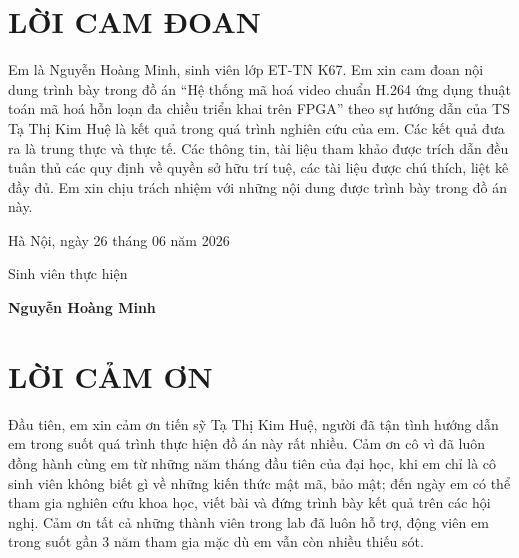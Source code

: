 \documentclass{thesis}
\begin{document}
\thispagestyle{empty}
    \newpage
        \clearpage
            \thispagestyle{empty}
                \cleardoublepage

\section*{LỜI CAM ĐOAN}
    \thispagestyle{empty}
Em là Nguyễn Hoàng Minh, sinh viên lớp ET-TN K67. Em xin cam đoan nội dung trình bày trong đồ án ``Hệ thống mã hoá video chuẩn H.264 ứng dụng thuật toán mã hoá hỗn loạn đa chiều triển khai trên FPGA'' theo sự hướng dẫn của TS Tạ Thị Kim Huệ là kết quả trong quá trình nghiên cứu của em. Các kết quả đưa ra là trung thực và thực tế. Các thông tin, tài liệu tham khảo được trích dẫn đều tuân thủ các quy định về quyền sở hữu trí tuệ, các tài liệu được chú thích, liệt kê đầy đủ. Em xin chịu trách nhiệm với những nội dung được trình bày trong đồ án này.

\vspace{6pt}
    \hspace{7cm}Hà Nội, ngày 26 tháng 06 năm 2026

        \hspace{8.6cm} Sinh viên thực hiện

\vspace{2cm}
    \hspace{8.6cm}\textbf{Nguyễn Hoàng Minh}

\thispagestyle{empty}
    \newpage
        \clearpage
            \thispagestyle{empty}
                \cleardoublepage

\newpage
\section*{LỜI CẢM ƠN}
    \thispagestyle{empty}
Đầu tiên, em xin cảm ơn tiến sỹ Tạ Thị Kim Huệ, người đã tận tình hướng dẫn em trong suốt quá trình thực hiện đồ án này rất nhiều. Cảm ơn cô vì đã luôn đồng hành cùng em từ những năm tháng đầu tiên của đại học, khi em chỉ là cô sinh viên không biết gì về những kiến thức mật mã, bảo mật; đến ngày em có thể tham gia nghiên cứu khoa học, viết bài và đứng trình bày kết quả trên các hội nghị. Cảm ơn tất cả những thành viên trong lab đã luôn hỗ trợ, động viên em trong suốt gần 3 năm tham gia mặc dù em vẫn còn nhiều thiếu sót.
\end{document}
